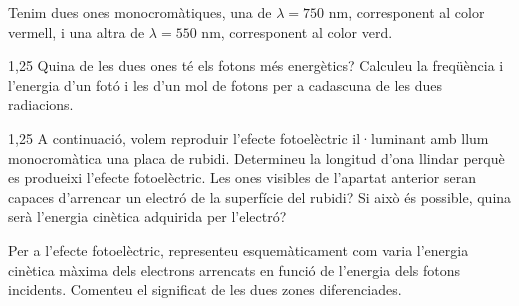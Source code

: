 Tenim dues ones monocromàtiques, una de $\lambda = 750$ nm, corresponent al color vermell,
i una altra de $\lambda = 550$ nm, corresponent al color verd.

\begin{apartat}{1,25}
Quina de les dues ones té els fotons més energètics? Calculeu la freqüència i l'energia
d'un fotó i les d'un mol de fotons per a cadascuna de les dues radiacions.
\end{apartat}

\begin{apartat}{1,25}
A continuació, volem reproduir l'efecte fotoelèctric il·luminant amb llum monocromàtica
una placa de rubidi. Determineu la longitud d'ona llindar perquè es produeixi l'efecte
fotoelèctric. Les ones visibles de l'apartat anterior seran capaces d'arrencar un electró
de la superfície del rubidi? Si això és possible, quina serà l'energia cinètica adquirida
per l'electró?

Per a l'efecte fotoelèctric, representeu esquemàticament com varia l'energia cinètica
màxima dels electrons arrencats en funció de l'energia dels fotons incidents. Comenteu el
significat de les dues zones diferenciades.
\end{apartat}

